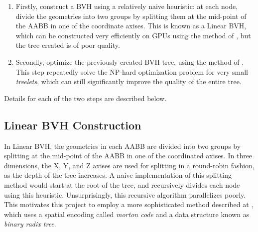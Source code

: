 \begin{enumerate}
    \item Firstly, construct a BVH using a relatively naive heuristic: at each node, divide the geometries into two groups by splitting them at the mid-point of the AABB in one of the coordinate axises. This is known as a Linear BVH, which can be constructed very efficiently on GPUs using the method of \cite{bvh_build}, but the tree created is of poor quality.
    \item Secondly, optimize the previously created BVH tree, using the method of \cite{bvh_optimize}. This step repeatedly solve the NP-hard optimization problem for very small \textit{treelets}, which can still significantly improve the quality of the entire tree.
\end{enumerate}
Details for each of the two steps are described below.

\subsection{Linear BVH Construction}
In Linear BVH, the geometries in each AABB are divided into two groups by splitting at the mid-point of the AABB in one of the coordinated axises. In three dimensions, the X, Y, and Z axises are used for splitting in a round-robin fashion, as the depth of the tree increases. A naive implementation of this splitting method would start at the root of the tree, and recursively divides each node using this heuristic. Unsurprisingly, this recursive algorithm parallelizes poorly. This motivates this project to employ a more sophisticated method described at \cite{bvh_build}, which uses a spatial encoding called \textit{morton code} and a data structure known as \textit{binary radix tree}.

